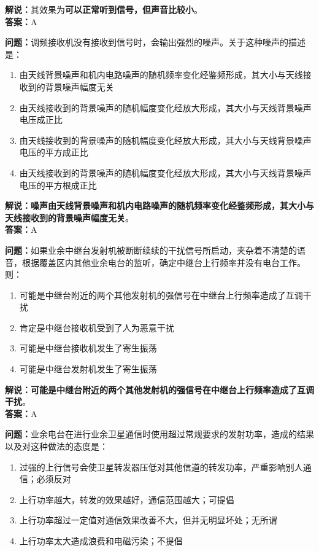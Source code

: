 \textbf{解说：}其效果为\textbf{可以正常听到信号，但声音比较小}。\\\textbf{答案：}A%


\textbf{问题：}调频接收机没有接收到信号时，会输出强烈的噪声。关于这种噪声的描述是：

\begin{enumerate}[label=\Alph*), leftmargin=1.5cm]
	\item 由天线背景噪声和机内电路噪声的随机频率变化经鉴频形成，其大小与天线接收到的背景噪声幅度无关
	\item 由天线接收到的背景噪声的随机幅度变化经放大形成，其大小与天线背景噪声电压成正比
	\item 由天线接收到的背景噪声的随机幅度变化经放大形成，其大小与天线背景噪声电压的平方成正比
	\item 由天线接收到的背景噪声的随机幅度变化经放大形成，其大小与天线背景噪声电压的平方根成正比
\end{enumerate}

\textbf{解说：噪声由天线背景噪声和机内电路噪声的随机频率变化经鉴频形成，其大小与天线接收到的背景噪声幅度无关}。\\\textbf{答案：}A%


\textbf{问题：}如果业余中继台发射机被断断续续的干扰信号所启动，夹杂着不清楚的语音，根据覆盖区内其他业余电台的监听，确定中继台上行频率并没有电台工作。则：

\begin{enumerate}[label=\Alph*), leftmargin=1.5cm]
	\item 可能是中继台附近的两个其他发射机的强信号在中继台上行频率造成了互调干扰
	\item 肯定是中继台接收机受到了人为恶意干扰
	\item 可能是中继台接收机发生了寄生振荡
	\item 可能是中继台发射机发生了寄生振荡
\end{enumerate}

\textbf{解说：可能是中继台附近的两个其他发射机的强信号在中继台上行频率造成了互调干扰}。\\\textbf{答案：}A%


\textbf{问题：}业余电台在进行业余卫星通信时使用超过常规要求的发射功率，造成的结果以及对这种做法的态度是：

\begin{enumerate}[label=\Alph*), leftmargin=1.5cm]
	\item 过强的上行信号会使卫星转发器压低对其他信道的转发功率，严重影响别人通信；必须反对
	\item 上行功率越大，转发的效果越好，通信范围越大；可提倡
	\item 上行功率超过一定值对通信效果改善不大，但并无明显坏处；无所谓
	\item 上行功率太大造成浪费和电磁污染；不提倡
\end{enumerate}

